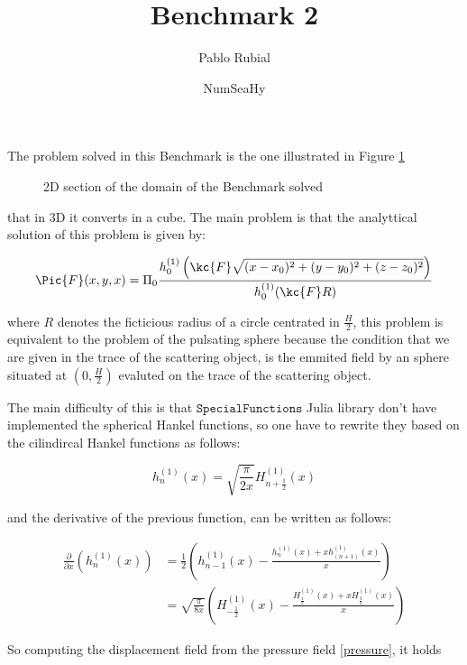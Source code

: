 \documentclass{article}[a4paper, 12pt]
\title{Benchmark 2}
\author{Pablo Rubial}
\date{NumSeaHy}
\begin{document}
\maketitle

The problem solved in this Benchmark is the one illustrated in Figure \ref{bench1}

\begin{figure}[h!]
 \centering
 
 \caption{2D section of the domain of the Benchmark solved}
 \label{bench1}
\end{figure}

that in 3D it converts in a cube. The main problem is that the analyttical solution of this problem is given by:

\begin{equation}\label{pressure}
    \Pic{F}(x,y,x) = \Pi_0 \frac{h_0^{(1)}\left(\kc{F}\displaystyle \sqrt{(x-x_0)^2 + (y-y_0)^2 + (z-z_0)^2}\right)}{h_0^{(1)}(\kc{F}R)}
\end{equation}

where $R$ denotes the ficticious radius of a circle centrated in $\frac{H}{2}$, this problem is equivalent to the problem of the pulsating sphere because the condition that we are given in the trace of the scattering object, is the emmited field by an sphere situated at $(0,\frac{H}{2})$ evaluted on the trace of the scattering object.

The main difficulty of this is that $\texttt{SpecialFunctions}$ Julia library don't have implemented the spherical Hankel functions, so one have to rewrite they based on the cilindircal Hankel functions as follows:


\begin{equation}
  h_n^{(1)}(x) = \sqrt{\frac{\pi}{2x}}H_{n+\frac{1}{2}}^{(1)}(x)
\end{equation}

and the derivative of the previous function, can be written as follows:


\begin{align}
  \frac{\partial}{\partial x}\left(h_n^{(1)}(x)\right) &= \frac{1}{2}\left(h_{n-1}^{(1)}(x) - \frac{h_n^{(1)}(x) + xh_{(n+1)}^{(1)}(x)}{x}\right)\\[1.5ex]
  &= \sqrt{\frac{\pi}{8x}}\left(H_{-\frac{1}{2}}^{(1)}(x)-\frac{H_{\frac{1}{2}}^{(1)}(x) + xH_{\frac{3}{2}}^{(1)}(x)}{x}\right)
\end{align}

So computing the displacement field from the pressure field \eqref{pressure}, it holds
\end{document}
